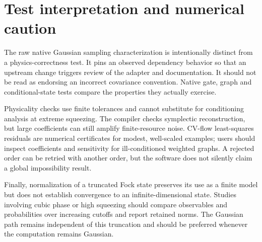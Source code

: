 \documentclass[a4paper,twocolumn,11pt,nopdfoutputerror]{quantumarticle}
\begin{document}
\section{Test interpretation and numerical caution}

The raw native Gaussian sampling characterization is intentionally distinct from
a physics-correctness test. It pins an observed dependency behavior so that an
upstream change triggers review of the adapter and documentation. It should not
be read as endorsing an incorrect covariance convention. Native gate, graph and
conditional-state tests compare the properties they actually exercise.

Physicality checks use finite tolerances and cannot substitute for conditioning
analysis at extreme squeezing. The compiler checks symplectic reconstruction,
but large coefficients can still amplify finite-resource noise. CV-flow
least-squares residuals are numerical certificates for modest, well-scaled
examples; users should inspect coefficients and sensitivity for ill-conditioned
weighted graphs. A rejected order can be retried with another order, but the
software does not silently claim a global impossibility result.

Finally, normalization of a truncated Fock state preserves its use as a finite
model but does not establish convergence to an infinite-dimensional state.
Studies involving cubic phase or high squeezing should compare observables and
probabilities over increasing cutoffs and report retained norms. The Gaussian
path remains independent of this truncation and should be preferred whenever
the computation remains Gaussian.
\end{document}
